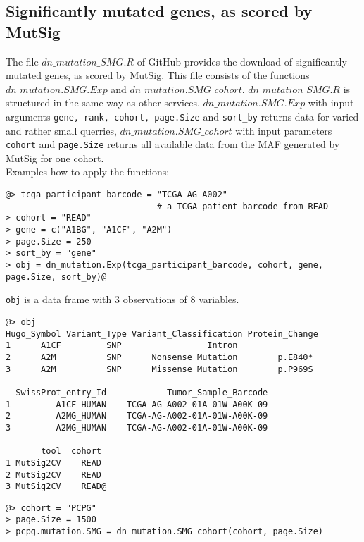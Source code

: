 \documentclass{TechReport}
\begin{document}
\subsection{Significantly mutated genes, as scored by MutSig}
The file $dn\_mutation\_SMG.R$ of GitHub provides the download of significantly
mutated genes, as scored by MutSig. This file consists of the functions 
$dn\_mutation.SMG.Exp$ and $dn\_mutation.SMG\_cohort$. $dn\_mutation\_SMG.R$ is
structured in the same way as other services.
$dn\_mutation.SMG.Exp$ with input arguments {\tt gene, rank, cohort, page.Size} and
{\tt sort\_by} returns data for varied and rather small querries,
$dn\_mutation.SMG\_cohort$ with input parameters {\tt cohort} and {\tt page.Size} 
returns all available data from the MAF generated by
MutSig for one cohort.\\
Examples how to apply the functions:
\begin{lstlisting}[style=base]
@> tcga_participant_barcode = "TCGA-AG-A002" 
                              # a TCGA patient barcode from READ
> cohort = "READ"
> gene = c("A1BG", "A1CF", "A2M")
> page.Size = 250
> sort_by = "gene"
> obj = dn_mutation.Exp(tcga_participant_barcode, cohort, gene, 
page.Size, sort_by)@
\end{lstlisting}
{\tt obj} is a data frame with 3 observations of 8 variables.
\begin{lstlisting}[style=base]
@> obj
Hugo_Symbol Variant_Type Variant_Classification Protein_Change 
1      A1CF         SNP                 Intron                        
2      A2M          SNP      Nonsense_Mutation        p.E840*         
3      A2M          SNP      Missense_Mutation        p.P969S    

  SwissProt_entry_Id            Tumor_Sample_Barcode       
1         A1CF_HUMAN    TCGA-AG-A002-01A-01W-A00K-09    
2         A2MG_HUMAN    TCGA-AG-A002-01A-01W-A00K-09     
3         A2MG_HUMAN    TCGA-AG-A002-01A-01W-A00K-09     

       tool  cohort
1 MutSig2CV    READ
2 MutSig2CV    READ
3 MutSig2CV    READ@
\end{lstlisting}



\begin{lstlisting}[style=base]
@> cohort = "PCPG"
> page.Size = 1500
> pcpg.mutation.SMG = dn_mutation.SMG_cohort(cohort, page.Size)
\end{lstlisting}
\end{document}
